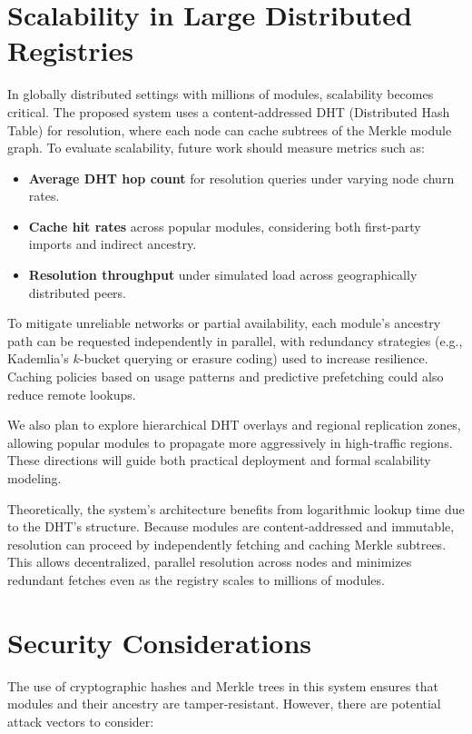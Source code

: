 \documentclass[sigplan,screen]{acmart}
\begin{document}
\section{Scalability in Large Distributed Registries}
\label{sec:scalability-distributed}

In globally distributed settings with millions of modules, scalability becomes critical. The proposed system uses a content-addressed DHT (Distributed Hash Table) for resolution, where each node can cache subtrees of the Merkle module graph. To evaluate scalability, future work should measure metrics such as:
\begin{itemize}
  \item \textbf{Average DHT hop count} for resolution queries under varying node churn rates.
  \item \textbf{Cache hit rates} across popular modules, considering both first-party imports and indirect ancestry.
  \item \textbf{Resolution throughput} under simulated load across geographically distributed peers.
\end{itemize}

To mitigate unreliable networks or partial availability, each module's ancestry path can be requested independently in parallel, with redundancy strategies (e.g., Kademlia's $k$-bucket querying or erasure coding) used to increase resilience. Caching policies based on usage patterns and predictive prefetching could also reduce remote lookups.

We also plan to explore hierarchical DHT overlays and regional replication zones, allowing popular modules to propagate more aggressively in high-traffic regions. These directions will guide both practical deployment and formal scalability modeling.

Theoretically, the system's architecture benefits from logarithmic lookup time due to the DHT's structure. Because modules are content-addressed and immutable, resolution can proceed by independently fetching and caching Merkle subtrees. This allows decentralized, parallel resolution across nodes and minimizes redundant fetches even as the registry scales to millions of modules.

\section{Security Considerations}

The use of cryptographic hashes and Merkle trees in this system ensures that modules and their ancestry are tamper-resistant. However, there are potential attack vectors to consider:
\end{document}
